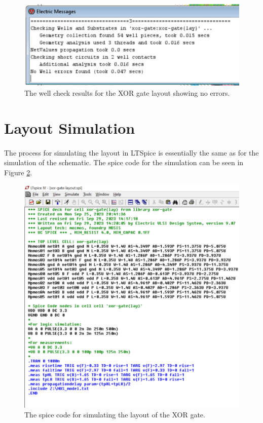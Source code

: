 \documentclass{article}
\begin{document}
  \begin{figure}[H]
    \centering
    \includegraphics[width=0.7\linewidth, frame]{screenshots/layout-well-check.png}
    \caption{The well check results for the XOR gate layout showing no errors.}
    \label{fig:well-check}
  \end{figure}

\section{Layout Simulation}
  \paragraph{}
  The process for simulating the layout in LTSpice is essentially the same as for the simulation of the schematic. The spice code for the simulation can be seen in Figure \ref{fig:spice-lay}.


  \begin{figure}[H]
    \centering
    \includegraphics[width=0.9\linewidth, frame]{screenshots/spice-layout.png}
    \caption{The spice code for simulating the layout of the XOR gate.}
    \label{fig:spice-lay}
  \end{figure}
\end{document}

